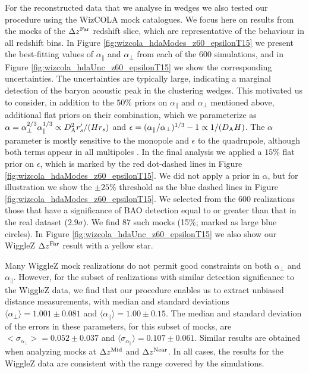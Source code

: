 \documentclass[a4paper,fleqn,usenatbib]{mnras}
\begin{document}
For the reconstructed data that we analyse in wedges we also tested our procedure using the WizCOLA mock catalogues.  We focus
here on results from the mocks of the $\Delta z^{\rm Far}$ redshift
slice, which are representative of the behaviour in all redshift bins.
In Figure \ref{fig:wizcola_hdaModes_z60_epsilonT15} we present the
best-fitting values of $\alpha_\parallel$ and $\alpha_\perp$ from each
of the 600 simulations, and in Figure
\ref{fig:wizcola_hdaUnc_z60_epsilonT15} we show the corresponding
uncertainties.  The uncertainties are typically large, indicating a
marginal detection of the baryon acoustic peak in the clustering
wedges.  This motivated us to consider, in addition to the $50\%$
priors on $\alpha_\parallel$ and $\alpha_\perp$ mentioned above,
additional flat priors on their combination, which we parameterize as
$\alpha = \alpha_\perp^{2/3} \alpha_\parallel^{1/3} \propto D_{\rm
  A}^2 r^\prime_s /(H r_s)$ and $\epsilon = (\alpha_\parallel/\alpha_\perp)^{1/3} - 1
\propto 1/(D_{\rm A} H)$.
The $\alpha$ parameter is mostly sensitive to
the monopole and $\epsilon$ to the quadrupole, although both terms appear in all
multipoles \citep[see][for a discussion]{PadmanabhanWhite2008}. In the
final analysis we applied a $15\%$ flat prior on $\epsilon$, which is
marked by the red dot-dashed lines in Figure
\ref{fig:wizcola_hdaModes_z60_epsilonT15}.  We did not apply a prior
in $\alpha$, but for illustration we show the $\pm 25\%$ threshold as
the blue dashed lines in Figure
\ref{fig:wizcola_hdaModes_z60_epsilonT15}.  We selected from the 600
realizations those that have a significance of BAO detection equal to
or greater than that in the real dataset ($2.9\sigma$).  We find 87
such mocks (15\%; marked as large blue circles).  In Figure
\ref{fig:wizcola_hdaUnc_z60_epsilonT15} we also show our WiggleZ
$\Delta z^{\rm Far}$ result with a yellow star.

Many WiggleZ mock realizations do not permit good constraints on both
$\alpha_\perp$ and $\alpha_\parallel$.  However, for the subset of
realizations with similar detection significance to the WiggleZ data,
we find that our procedure enables us to extract unbiased distance
measurements, with median and standard deviations $\langle \alpha_\perp \rangle =
1.001 \pm 0.081$ and $\langle \alpha_\parallel \rangle = 1.00 \pm 0.15$.  The
median and standard deviation of the errors in these parameters, for
this subset of mocks, are $<\sigma_{\alpha_\perp}> = 0.052 \pm 0.037$
and $\langle \sigma_{\alpha_\parallel} \rangle = 0.107 \pm 0.061$.  Similar results
are obtained when analyzing mocks at $\Delta z^{\rm Mid}$ and $\Delta
z^{\rm Near}$.  In all cases, the results for the WiggleZ data are
consistent with the range covered by the simulations.
\end{document}
